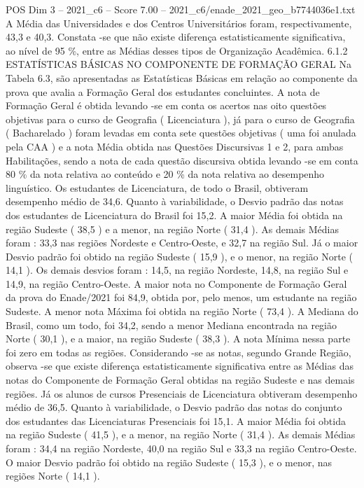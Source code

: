 \begin{textsample}{POS Dim 3 – 2021\_c6 – Score 7.00 – 2021\_c6/enade\_2021\_geo\_b7744036e1.txt}
A Média das Universidades e dos Centros Universitários foram, respectivamente, 43,3 e 40,3.
Constata -se que não existe diferença estatisticamente significativa, ao nível de 95 \%, entre as Médias desses tipos de Organização Acadêmica. 6.1.2 ESTATÍSTICAS BÁSICAS NO COMPONENTE DE FORMAÇÃO GERAL Na Tabela 6.3, são apresentadas as Estatísticas Básicas em relação ao componente da prova que avalia a Formação Geral dos estudantes concluintes.
A nota de Formação Geral é obtida levando -se em conta os acertos nas oito questões objetivas para o curso de Geografia ( Licenciatura ), já para o curso de Geografia ( Bacharelado ) foram levadas em conta sete questões objetivas ( uma foi anulada pela CAA ) e a nota Média obtida nas Questões Discursivas 1 e 2, para ambas Habilitações, sendo a nota de cada questão discursiva obtida levando -se em conta 80 \% da nota relativa ao conteúdo e 20 \% da nota relativa ao desempenho linguístico.
Os estudantes de Licenciatura, de todo o Brasil, obtiveram desempenho médio de 34,6.
Quanto à variabilidade, o Desvio padrão das notas dos estudantes de Licenciatura do Brasil foi 15,2.
A maior Média foi obtida na região Sudeste ( 38,5 ) e a menor, na região Norte ( 31,4 ).
As demais Médias foram : 33,3 nas regiões Nordeste e Centro-Oeste, e 32,7 na região Sul.
Já o maior Desvio padrão foi obtido na região Sudeste ( 15,9 ), e o menor, na região Norte ( 14,1 ).
Os demais desvios foram : 14,5, na região Nordeste, 14,8, na região Sul e 14,9, na região Centro-Oeste.
A maior nota no Componente de Formação Geral da prova do Enade/2021 foi 84,9, obtida por, pelo menos, um estudante na região Sudeste.
A menor nota Máxima foi obtida na região Norte ( 73,4 ).
A Mediana do Brasil, como um todo, foi 34,2, sendo a menor Mediana encontrada na região Norte ( 30,1 ), e a maior, na região Sudeste ( 38,3 ).
A nota Mínima nessa parte foi zero em todas as regiões.
Considerando -se as notas, segundo Grande Região, observa -se que existe diferença estatisticamente significativa entre as Médias das notas do Componente de Formação Geral obtidas na região Sudeste e nas demais regiões.
Já os alunos de cursos Presenciais de Licenciatura obtiveram desempenho médio de 36,5.
Quanto à variabilidade, o Desvio padrão das notas do conjunto dos estudantes das Licenciaturas Presenciais foi 15,1.
A maior Média foi obtida na região Sudeste ( 41,5 ), e a menor, na região Norte ( 31,4 ).
As demais Médias foram : 34,4 na região Nordeste, 40,0 na região Sul e 33,3 na região Centro-Oeste.
O maior Desvio padrão foi obtido na região Sudeste ( 15,3 ), e o menor, nas regiões Norte ( 14,1 ).

\end{textsample}
